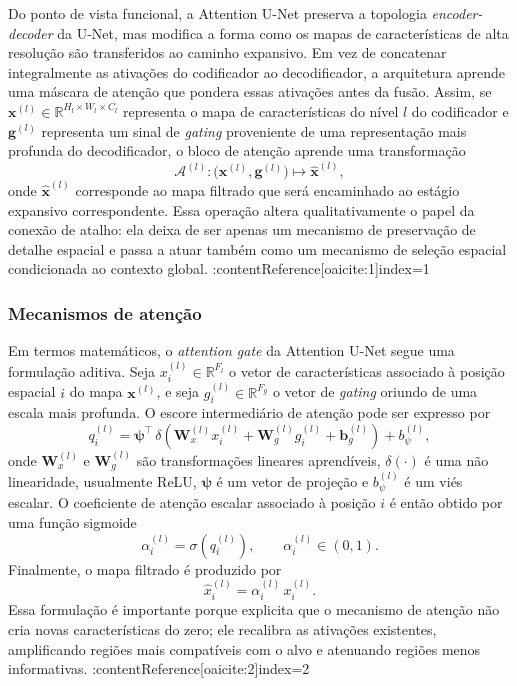 \documentclass[tcc,capa]{texufpel}
\begin{document}
Do ponto de vista funcional, a Attention U-Net preserva a topologia \textit{encoder-decoder} da U-Net, mas modifica a forma como os mapas de características de alta resolução são transferidos ao caminho expansivo. Em vez de concatenar integralmente as ativações do codificador ao decodificador, a arquitetura aprende uma máscara de atenção que pondera essas ativações antes da fusão. Assim, se \(\mathbf{x}^{(l)} \in \mathbb{R}^{H_l \times W_l \times C_l}\) representa o mapa de características do nível \(l\) do codificador e \(\mathbf{g}^{(l)}\) representa um sinal de \textit{gating} proveniente de uma representação mais profunda do decodificador, o bloco de atenção aprende uma transformação
\begin{equation}
	\mathcal{A}^{(l)} : \big(\mathbf{x}^{(l)}, \mathbf{g}^{(l)}\big) \mapsto \hat{\mathbf{x}}^{(l)},
\end{equation}
onde \(\hat{\mathbf{x}}^{(l)}\) corresponde ao mapa filtrado que será encaminhado ao estágio expansivo correspondente. Essa operação altera qualitativamente o papel da conexão de atalho: ela deixa de ser apenas um mecanismo de preservação de detalhe espacial e passa a atuar também como um mecanismo de seleção espacial condicionada ao contexto global. :contentReference[oaicite:1]{index=1}

\subsubsection{Mecanismos de atenção}

Em termos matemáticos, o \textit{attention gate} da Attention U-Net segue uma formulação aditiva. Seja \(x_i^{(l)} \in \mathbb{R}^{F_l}\) o vetor de características associado à posição espacial \(i\) do mapa \(\mathbf{x}^{(l)}\), e seja \(g_i^{(l)} \in \mathbb{R}^{F_g}\) o vetor de \textit{gating} oriundo de uma escala mais profunda. O escore intermediário de atenção pode ser expresso por
\begin{equation}
	q_i^{(l)}
	=
	\boldsymbol{\psi}^{\top}
	\,
	\delta
	\!\left(
	\mathbf{W}_x^{(l)} x_i^{(l)}
	+
	\mathbf{W}_g^{(l)} g_i^{(l)}
	+
	\mathbf{b}_g^{(l)}
	\right)
	+
	b_{\psi}^{(l)},
\end{equation}
onde \(\mathbf{W}_x^{(l)}\) e \(\mathbf{W}_g^{(l)}\) são transformações lineares aprendíveis, \(\delta(\cdot)\) é uma não linearidade, usualmente ReLU, \(\boldsymbol{\psi}\) é um vetor de projeção e \(b_{\psi}^{(l)}\) é um viés escalar. O coeficiente de atenção escalar associado à posição \(i\) é então obtido por uma função sigmoide
\begin{equation}
	\alpha_i^{(l)}
	=
	\sigma\!\left(q_i^{(l)}\right),
	\qquad
	\alpha_i^{(l)} \in (0,1).
\end{equation}
Finalmente, o mapa filtrado é produzido por
\begin{equation}
	\hat{x}_i^{(l)} = \alpha_i^{(l)}\,x_i^{(l)}.
\end{equation}
Essa formulação é importante porque explicita que o mecanismo de atenção não cria novas características do zero; ele recalibra as ativações existentes, amplificando regiões mais compatíveis com o alvo e atenuando regiões menos informativas. :contentReference[oaicite:2]{index=2}
\end{document}
